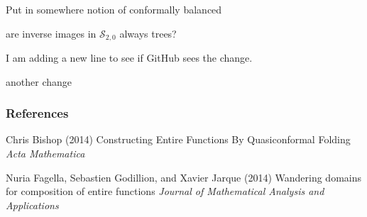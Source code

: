 \documentclass{beamer}
\begin{document}
\begin{frame}

\end{frame}











\begin{frame}

Put in somewhere notion of {\color{red} conformally balanced}

are inverse images in $\mathcal{S}_{2,0}$ always trees?

I am adding a new line to see if GitHub sees the change.

another change

\end{frame}








\begin{frame}
\frametitle{References}
\footnotesize{
\begin{thebibliography}{99} %
  Chris Bishop (2014)
\newblock Constructing Entire Functions By Quasiconformal Folding
\newblock \emph{Acta Mathematica}

 Nuria Fagella, Sebastien Godillion, and Xavier Jarque (2014)
\newblock Wandering domains for composition of entire functions
\newblock \emph{Journal of Mathematical Analysis and Applications} 


\end{thebibliography}
}
\end{frame}


\end{document}
